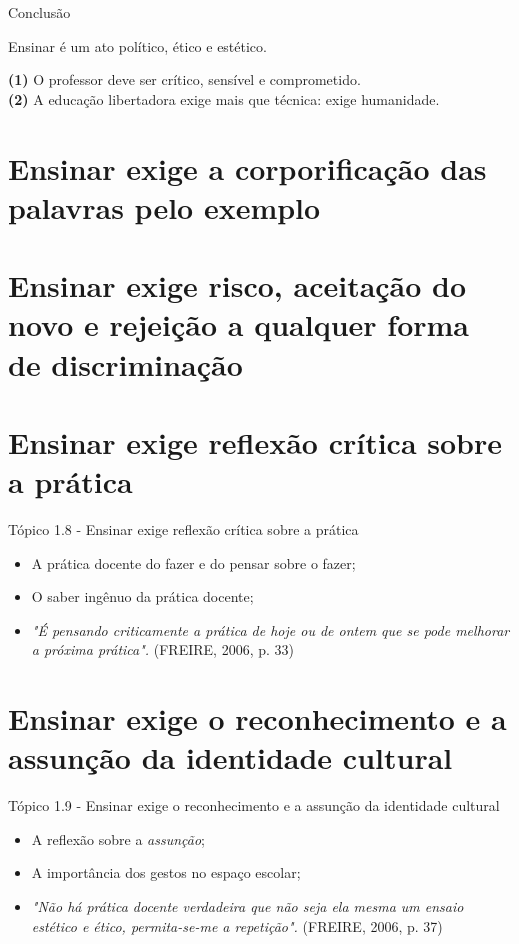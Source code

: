 \documentclass[12pt]{beamer}
\begin{document}
	\begin{frame}{Conclusão}
		
		\begin{alertblock}{\justifying Ensinar é um ato político, ético e estético.}
			
			\justifying
			\textbf{(1)} O professor deve ser crítico, sensível e comprometido. \\
			\textbf{(2)} A educação libertadora exige mais que técnica: exige humanidade.\\
	
		\end{alertblock}
		
	\end{frame}
\section{Ensinar exige a corporificação das palavras pelo exemplo}
\section{Ensinar exige risco, aceitação do novo e rejeição a qualquer forma de discriminação}
\section{Ensinar exige reflexão crítica sobre a prática}

	\begin{frame}{Tópico 1.8 - Ensinar exige reflexão crítica sobre a prática}
		\begin{itemize}
			\justifying
			\item A prática docente do fazer e do pensar sobre o fazer; \\
			\item O saber ingênuo da prática docente; \\
			\item \textit{"É pensando criticamente a prática de hoje ou de ontem que se pode melhorar a próxima prática".} (FREIRE, 2006, p. 33)
		\end{itemize}
	\end{frame}
	
\section{Ensinar exige o reconhecimento e a assunção da identidade cultural}

	\begin{frame}{Tópico 1.9 - Ensinar exige o reconhecimento e a assunção da identidade cultural}
		\begin{itemize}
			\justifying
			\item A reflexão sobre a \textit{assunção}; \\
			\item A importância dos gestos no espaço escolar; \\
			\item \textit{"Não há prática docente verdadeira que não seja ela mesma um ensaio estético e ético, permita-se-me a repetição".}  (FREIRE, 2006, p. 37)
			
		\end{itemize}
	\end{frame}
	
\end{document}
